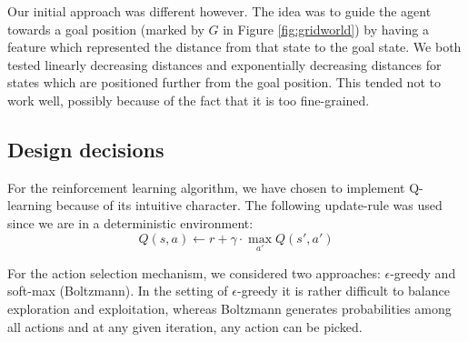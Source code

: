 \documentclass[10pt,a4paper,twocolumn]{article}
\begin{document}
Our initial approach was different however. The idea was to guide the agent towards a goal position (marked by $G$ in Figure \ref{fig:gridworld}) by having a feature which represented the distance from that state to the goal state.
We both tested linearly decreasing distances and exponentially decreasing distances for states which are positioned further from the goal position. This tended not to work well, possibly because of the fact that it is too fine-grained.

\subsection{Design decisions}
For the reinforcement learning algorithm, we have chosen to implement Q-learning because of its intuitive character. The following update-rule was used since we are in a deterministic environment:
$$Q(s,a) \gets r + \gamma\cdot \max\limits_{a'}Q(s',a')$$

For the action selection mechanism, we considered two approaches: $\epsilon$-greedy and soft-max (Boltzmann). In the setting of $\epsilon$-greedy it is rather difficult to balance exploration and exploitation, whereas Boltzmann generates probabilities among all actions and at any given iteration, any action can be picked.

\end{document}
